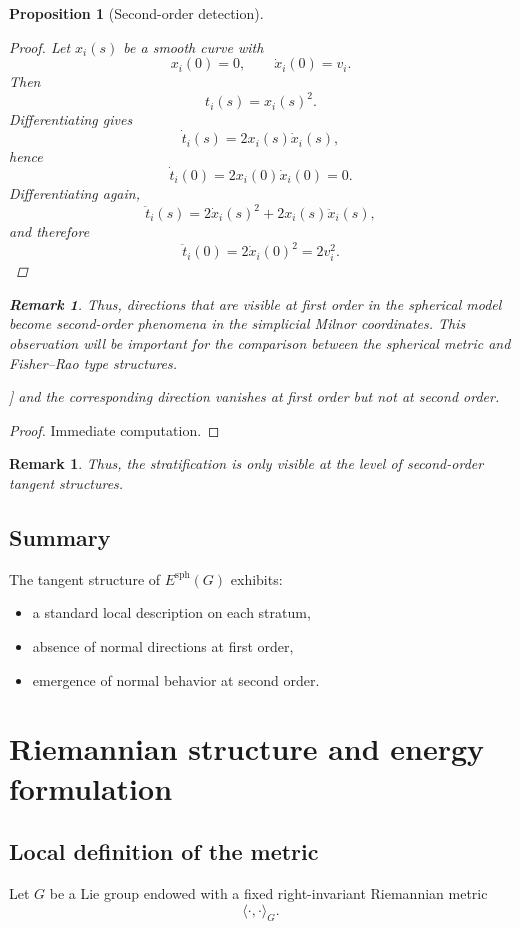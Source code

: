 \documentclass[11pt]{amsart}
\newtheorem{proposition}[theorem]{Proposition}
\newtheorem{remark}[theorem]{Remark}
\begin{document}
\begin{proposition}[Second-order detection]
\begin{proof}
Let \(x_i(s)\) be a smooth curve with
\[
x_i(0)=0,\qquad \dot x_i(0)=v_i.
\]
Then
\[
t_i(s)=x_i(s)^2.
\]
Differentiating gives
\[
\dot t_i(s)=2x_i(s)\dot x_i(s),
\]
hence
\[
\dot t_i(0)=2x_i(0)\dot x_i(0)=0.
\]
Differentiating again,
\[
\ddot t_i(s)=2\dot x_i(s)^2+2x_i(s)\ddot x_i(s),
\]
and therefore
\[
\ddot t_i(0)=2\dot x_i(0)^2=2v_i^2.
\]
\end{proof}

\begin{remark}
Thus, directions that are visible at first order in the spherical model become second-order phenomena in the simplicial Milnor coordinates. This observation will be important for the comparison between the spherical metric and Fisher--Rao type structures.
\end{remark}]
and the corresponding direction vanishes at first order but not at second order.
\end{proposition}

\begin{proof}
Immediate computation.
\end{proof}

\begin{remark}
Thus, the stratification is only visible at the level of second-order tangent structures.
\end{remark}
\subsection{Summary}

The tangent structure of $E^{\mathrm{sph}}(G)$ exhibits:
\begin{itemize}
\item a standard local description on each stratum,
\item absence of normal directions at first order,
\item emergence of normal behavior at second order.
\end{itemize}
\section{Riemannian structure and energy formulation} \label{6}

\subsection{Local definition of the metric}

Let $G$ be a Lie group endowed with a fixed right-invariant Riemannian metric
\[
\langle \cdot,\cdot \rangle_G.
\]
\end{document}
